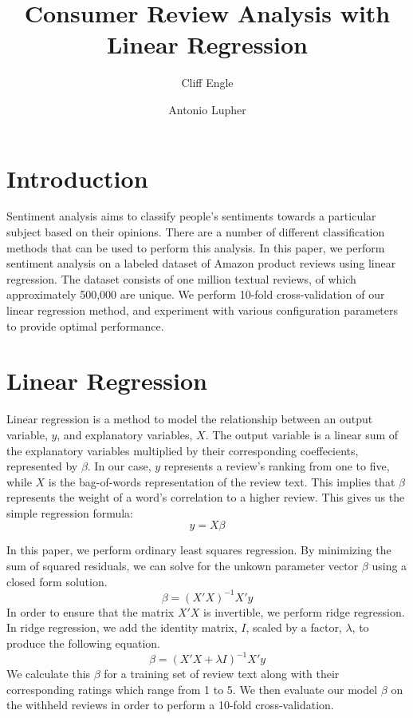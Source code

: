 \documentclass{article}
\title{Consumer Review Analysis with Linear Regression}
\author{Cliff Engle \and Antonio Lupher}
\begin{document}

\maketitle

\section{Introduction}
Sentiment analysis aims to classify people's sentiments towards a particular subject based on their opinions. There are a number of different classification methods that can be used to perform this analysis. In this paper, we perform sentiment analysis on a labeled dataset of Amazon product reviews using linear regression. The dataset consists of one million textual reviews, of which approximately 500,000 are unique. We perform 10-fold cross-validation of our linear regression method, and experiment with various configuration parameters to provide optimal performance.

\section{Linear Regression}
Linear regression is a method to model the relationship between an output variable, $y$, and explanatory variables, $X$. The output variable is a linear sum of the explanatory variables multiplied by their corresponding coeffecients, represented by $\beta$. In our case, $y$ represents a review's ranking from one to five, while $X$ is the bag-of-words representation of the review text. This implies that $\beta$ represents the weight of a word's correlation to a higher review. This gives us the simple regression formula: $$y=X\beta$$

In this paper, we perform ordinary least squares regression. By minimizing the sum of squared residuals, we can solve for the unkown parameter vector $\beta$ using a closed form solution. $$\beta=(X'X)^{-1}X'y$$ In order to ensure that the matrix $X'X$ is invertible, we perform ridge regression. In ridge regression, we add the identity matrix, $I$, scaled by a factor, $\lambda$, to produce the following equation. $$\beta=(X'X+\lambda I)^{-1}X'y$$ We calculate this $\beta$ for a training set of review text along with their corresponding ratings which range from 1 to 5. We then evaluate our model $\beta$ on the withheld reviews in order to perform a 10-fold cross-validation.
\end{document}
